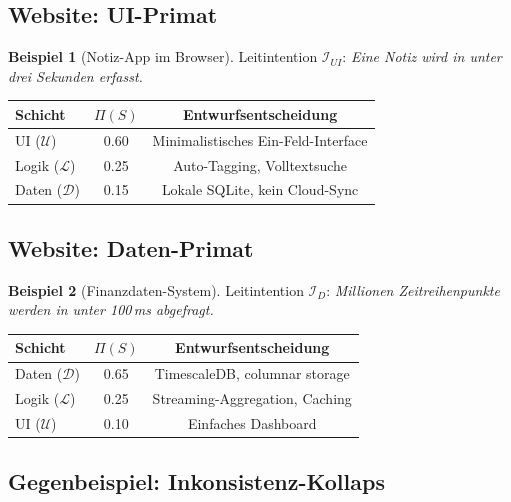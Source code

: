﻿\documentclass[a4paper,12pt]{article}
\theoremstyle{definition}
\newtheorem{beispiel}{Beispiel}
\begin{document}
\subsection{Website: UI-Primat}

\begin{beispiel}[Notiz-App im Browser]\label{bsp:notiz}
Leitintention $\mathcal{I}_{UI}$: \textit{\glqq{}Eine Notiz wird in unter
drei Sekunden erfasst.\grqq{}}

\begin{center}
\begin{tabular}{lcc}
\toprule
Schicht & $\Pi(S)$ & Entwurfsentscheidung \\
\midrule
UI ($\mathcal{U}$) & 0.60 & Minimalistisches Ein-Feld-Interface \\
Logik ($\mathcal{L}$) & 0.25 & Auto-Tagging, Volltextsuche \\
Daten ($\mathcal{D}$) & 0.15 & Lokale SQLite, kein Cloud-Sync \\
\bottomrule
\end{tabular}
\end{center}
\end{beispiel}

\subsection{Website: Daten-Primat}

\begin{beispiel}[Finanzdaten-System]\label{bsp:finanzen}
Leitintention $\mathcal{I}_D$: \textit{\glqq{}Millionen Zeitreihenpunkte
werden in unter 100\,ms abgefragt.\grqq{}}

\begin{center}
\begin{tabular}{lcc}
\toprule
Schicht & $\Pi(S)$ & Entwurfsentscheidung \\
\midrule
Daten ($\mathcal{D}$) & 0.65 & TimescaleDB, columnar storage \\
Logik ($\mathcal{L}$) & 0.25 & Streaming-Aggregation, Caching \\
UI ($\mathcal{U}$) & 0.10 & Einfaches Dashboard \\
\bottomrule
\end{tabular}
\end{center}
\end{beispiel}

\subsection{Gegenbeispiel: Inkonsistenz-Kollaps}
\end{document}
